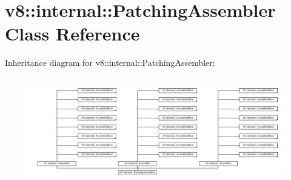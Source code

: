 \hypertarget{classv8_1_1internal_1_1PatchingAssembler}{}\section{v8\+:\+:internal\+:\+:Patching\+Assembler Class Reference}
\label{classv8_1_1internal_1_1PatchingAssembler}
Inheritance diagram for v8\+:\+:internal\+:\+:Patching\+Assembler\+:\begin{figure}[H]
\begin{center}
\leavevmode
\includegraphics[height=4.761905cm]{classv8_1_1internal_1_1PatchingAssembler}
\end{center}
\end{figure}
